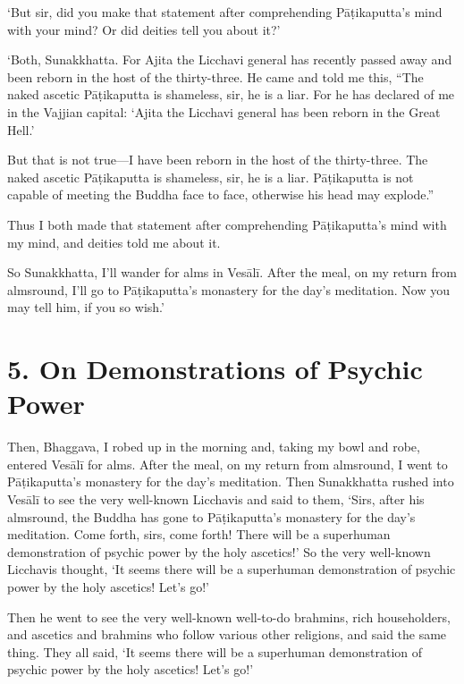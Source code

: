 \documentclass[12pt,openany]{book}%
\begin{document}
‘But sir, did you make that statement after comprehending \textsanskrit{Pāṭikaputta}’s mind with your mind? Or did deities tell you about it?’ 

‘Both, Sunakkhatta. For Ajita the Licchavi general has recently passed away and been reborn in the host of the thirty-three. He came and told me this, “The naked ascetic \textsanskrit{Pāṭikaputta} is shameless, sir, he is a liar. For he has declared of me in the Vajjian capital: ‘Ajita the Licchavi general has been reborn in the Great Hell.’ 

But that is not true—I have been reborn in the host of the thirty-three. The naked ascetic \textsanskrit{Pāṭikaputta} is shameless, sir, he is a liar. \textsanskrit{Pāṭikaputta} is not capable of meeting the Buddha face to face, otherwise his head may explode.” 

Thus I both made that statement after comprehending \textsanskrit{Pāṭikaputta}’s mind with my mind, and deities told me about it. 

So Sunakkhatta, I’ll wander for alms in \textsanskrit{Vesālī}. After the meal, on my return from almsround, I’ll go to \textsanskrit{Pāṭikaputta}’s monastery for the day’s meditation. Now you may tell him, if you so wish.’ 

\section*{5. On Demonstrations of Psychic Power }

Then, Bhaggava, I robed up in the morning and, taking my bowl and robe, entered \textsanskrit{Vesālī} for alms. After the meal, on my return from almsround, I went to \textsanskrit{Pāṭikaputta}’s monastery for the day’s meditation. Then Sunakkhatta rushed into \textsanskrit{Vesālī} to see the very well-known Licchavis and said to them, ‘Sirs, after his almsround, the Buddha has gone to \textsanskrit{Pāṭikaputta}’s monastery for the day’s meditation. Come forth, sirs, come forth! There will be a superhuman demonstration of psychic power by the holy ascetics!’ So the very well-known Licchavis thought, ‘It seems there will be a superhuman demonstration of psychic power by the holy ascetics! Let’s go!’ 

Then he went to see the very well-known well-to-do brahmins, rich householders, and ascetics and brahmins who follow various other religions, and said the same thing. They all said, ‘It seems there will be a superhuman demonstration of psychic power by the holy ascetics! Let’s go!’ 
\end{document}
